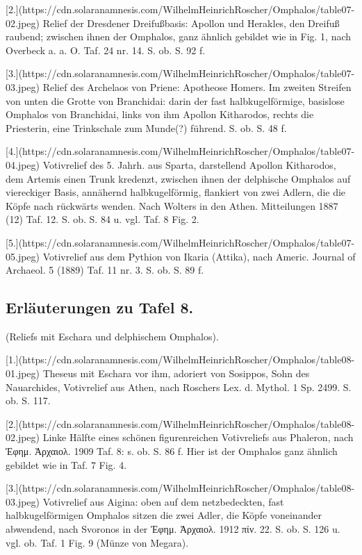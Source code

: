 \documentclass[a4paper, 11pt, oneside]{article}
\begin{document}
[2.](https://cdn.solaranamnesis.com/WilhelmHeinrichRoscher/Omphalos/table07-02.jpeg) Relief der Dresdener Dreifußbasis: Apollon und Herakles, den Dreifuß raubend; zwischen ihnen der Omphalos, ganz ähnlich gebildet wie in Fig. 1, nach Overbeck a. a. O. Taf. 24 nr. 14. S. ob. S. 92 f.

[3.](https://cdn.solaranamnesis.com/WilhelmHeinrichRoscher/Omphalos/table07-03.jpeg) Relief des Archelaos von Priene: Apotheose Homers. Im zweiten Streifen von unten die Grotte von Branchidai: darin der fast halbkugelförmige, basislose Omphalos von Branchidai, links von ihm Apollon Kitharodos, rechts die Priesterin, eine Trinkschale zum Munde(?) führend. S. ob. S. 48 f.

[4.](https://cdn.solaranamnesis.com/WilhelmHeinrichRoscher/Omphalos/table07-04.jpeg) Votivrelief des 5. Jahrh. aus Sparta, darstellend Apollon Kitharodos, dem Artemis einen Trunk kredenzt, zwischen ihnen der delphische Omphalos auf viereckiger Basis, annähernd halbkugelförmig, flankiert von zwei Adlern, die die Köpfe nach rückwärts wenden. Nach Wolters in den Athen. Mitteilungen 1887 (12) Taf. 12. S. ob. S. 84 u. vgl. Taf. 8 Fig. 2.

[5.](https://cdn.solaranamnesis.com/WilhelmHeinrichRoscher/Omphalos/table07-05.jpeg) Votivrelief aus dem Pythion von Ikaria (Attika), nach Americ. Journal of Archaeol. 5 (1889) Taf. 11 nr. 3. S. ob. S. 89 f.
\clearpage
\subsection{Erläuterungen zu Tafel 8.}

(Reliefs mit Eschara und delphischem Omphalos).

[1.](https://cdn.solaranamnesis.com/WilhelmHeinrichRoscher/Omphalos/table08-01.jpeg) Theseus mit Eschara vor ihm, adoriert von Sosippos, Sohn des Nauarchides, Votivrelief aus Athen, nach Roschers Lex. d. Mythol. 1 Sp. 2499. S. ob. S. 117.

[2.](https://cdn.solaranamnesis.com/WilhelmHeinrichRoscher/Omphalos/table08-02.jpeg) Linke Hälfte eines schönen figurenreichen Votivreliefs aus Phaleron, nach Ἐφημ. Ἀρχαιολ. 1909 Taf. 8: s. ob. S. 86 f. Hier ist der Omphalos ganz ähnlich gebildet wie in Taf. 7 Fig. 4.

[3.](https://cdn.solaranamnesis.com/WilhelmHeinrichRoscher/Omphalos/table08-03.jpeg) Votivrelief aus Aigina: oben auf dem netzbedeckten, fast halbkugelförmigen Omphalos sitzen die zwei Adler, die Köpfe voneinander abwendend, nach Svoronos in der Ἐφημ. Ἀρχαιολ. 1912 πίν. 22. S. ob. S. 126 u. vgl. ob. Taf. 1 Fig. 9 (Münze von Megara).
\clearpage
\end{document}
